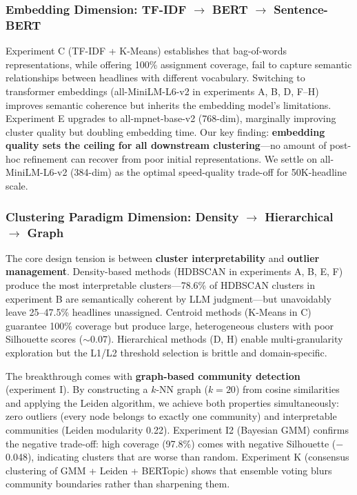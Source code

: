 \documentclass[10pt,twocolumn,twoside]{article}
\begin{document}
\subsubsection{Embedding Dimension: TF-IDF $\rightarrow$ BERT $\rightarrow$ Sentence-BERT}
Experiment C (TF-IDF + K-Means) establishes that bag-of-words representations, while offering 
100\% assignment coverage, fail to capture semantic relationships between headlines with different 
vocabulary. Switching to transformer embeddings (all-MiniLM-L6-v2 in experiments A, B, D, F--H) 
improves semantic coherence but inherits the embedding model's limitations. Experiment E 
upgrades to all-mpnet-base-v2 (768-dim), marginally improving cluster quality but doubling 
embedding time. Our key finding: \textbf{embedding quality sets the ceiling for all downstream 
clustering}---no amount of post-hoc refinement can recover from poor initial representations. 
We settle on all-MiniLM-L6-v2 (384-dim) as the optimal speed-quality trade-off for 50K-headline 
scale.

\subsubsection{Clustering Paradigm Dimension: Density $\rightarrow$ Hierarchical $\rightarrow$ Graph}
The core design tension is between \textbf{cluster interpretability} and \textbf{outlier 
management}. Density-based methods (HDBSCAN in experiments A, B, E, F) produce the most 
interpretable clusters---78.6\% of HDBSCAN clusters in experiment B are semantically coherent 
by LLM judgment---but unavoidably leave 25--47.5\% headlines unassigned. Centroid methods 
(K-Means in C) guarantee 100\% coverage but produce large, heterogeneous clusters with poor Silhouette scores ($\sim$0.07). Hierarchical methods (D, H) enable multi-granularity exploration 
but the L1/L2 threshold selection is brittle and domain-specific.

The breakthrough comes with \textbf{graph-based community detection} (experiment I). By 
constructing a $k$-NN graph ($k=20$) from cosine similarities and applying the Leiden algorithm, 
we achieve both properties simultaneously: zero outliers (every node belongs to exactly one 
community) and interpretable communities (Leiden modularity 0.22). Experiment I2 (Bayesian GMM) 
confirms the negative trade-off: high coverage (97.8\%) comes with negative Silhouette ($-$0.048), 
indicating clusters that are worse than random. Experiment K (consensus clustering of GMM + 
Leiden + BERTopic) shows that ensemble voting blurs community boundaries rather than sharpening them.
\end{document}
